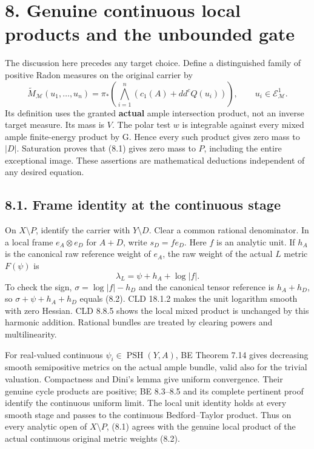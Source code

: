 \documentclass[
  10pt,
]{article}
\begin{document}
\section{8. Genuine continuous local products and the unbounded
gate}\label{genuine-continuous-local-products-and-the-unbounded-gate}

The discussion here precedes any target choice. Define a distinguished
family of positive Radon measures on the original carrier by \[
 \widetilde M_{\mathcal M}(u_1,\ldots,u_n)
   =\pi_*\left(\bigwedge_{i=1}^n(c_1(A)+dd^cQ(u_i))\right),
 \qquad u_i\in\mathcal E^1_{\mathcal M}.
 \tag{8.1}
\] Its definition uses the granted \textbf{actual} ample intersection
product, not an inverse target measure. Its mass is \(V\). The polar
test \(w\) is integrable against every mixed ample finite-energy product
by G. Hence every such product gives zero mass to \(|D|\). Saturation
proves that (8.1) gives zero mass to \(P\), including the entire
exceptional image. These assertions are mathematical deductions
independent of any desired equation.

\subsection{8.1. Frame identity at the continuous
stage}\label{frame-identity-at-the-continuous-stage}

On \(X\setminus P\), identify the carrier with \(Y\setminus D\). Clear a
common rational denominator. In a local frame \(e_A\otimes e_D\) for
\(A+D\), write \(s_D=f e_D\). Here \(f\) is an analytic unit. If \(h_A\)
is the canonical raw reference weight of \(e_A\), the raw weight of the
actual \(L\) metric \(F(\psi)\) is \[
 \lambda_L=\psi+h_A+\log|f|.
 \tag{8.2}
\] To check the sign, \(\sigma=\log|f|-h_D\) and the canonical tensor
reference is \(h_A+h_D\), so \(\sigma+\psi+h_A+h_D\) equals (8.2). CLD
18.1.2 makes the unit logarithm smooth with zero Hessian. CLD 8.8.5
shows the local mixed product is unchanged by this harmonic addition.
Rational bundles are treated by clearing powers and multilinearity.

For real-valued continuous \(\psi_i\in\operatorname{PSH}(Y,A)\), BE
Theorem 7.14 gives decreasing smooth semipositive metrics on the actual
ample bundle, valid also for the trivial valuation. Compactness and
Dini's lemma give uniform convergence. Their genuine cycle products are
positive; BE 8.3--8.5 and its complete pertinent proof identify the
continuous uniform limit. The local unit identity holds at every smooth
stage and passes to the continuous Bedford--Taylor product. Thus on
every analytic open of \(X\setminus P\), (8.1) agrees with the genuine
local product of the actual continuous original metric weights (8.2).
\end{document}
